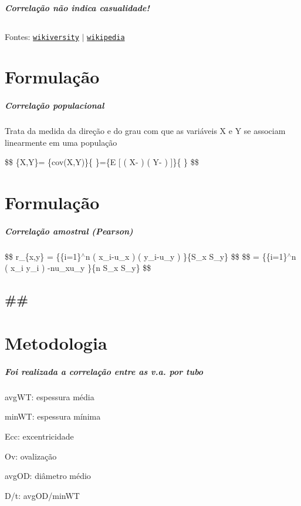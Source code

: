 \subparagraph*{Correlação não indica casualidade!}

\subsection*{}

Fontes\+: \href{https://en.wikiversity.org/wiki/Correlation}{\tt wikiversity} $\vert$ \href{https://en.wikipedia.org/wiki/Correlation_does_not_imply_causation}{\tt wikipedia} 



\section*{Formulação}

\subparagraph*{Correlação populacional}

Trata da medida da direção e do grau com que as variáveis X e Y se associam linearmente em uma população

\$\$ \{X,Y\}= \{cov(\+X,\+Y)\}\{ \}=\{E \mbox{[} ( X-\/ ) ( Y-\/ ) \mbox{]}\}\{ \} \$\$





\section*{Formulação}

\subparagraph*{Correlação amostral (Pearson)}

\$\$ r\+\_\+\{x,y\} = \{\{i=1\}$^\wedge$n ( x\+\_\+i-\/u\+\_\+x ) ( y\+\_\+i-\/u\+\_\+y ) \}\{S\+\_\+x S\+\_\+y\} \$\$ \$\$ = \{\{i=1\}$^\wedge$n ( x\+\_\+i y\+\_\+i ) -\/nu\+\_\+xu\+\_\+y \}\{n S\+\_\+x S\+\_\+y\} \$\$

\subsection*{\#\#  }

\section*{Metodologia}

\subparagraph*{Foi realizada a correlação entre as v.\+a. por tubo}


\begin{DoxyItemize}
\item avg\+WT\+: espessura média
\item min\+WT\+: espessura mínima
\item Ecc\+: excentricidade
\item Ov\+: ovalização
\item avg\+OD\+: diâmetro médio
\item D/t\+: avg\+O\+D/min\+WT
\end{DoxyItemize}

